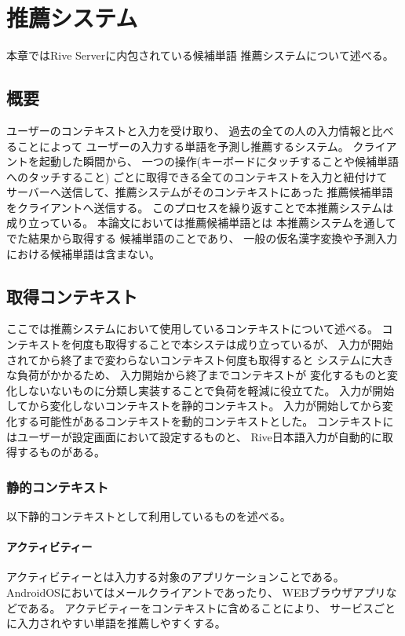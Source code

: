 \chapter{推薦システム}
\label{chap:recommend}
本章ではRive Serverに内包されている候補単語
推薦システムについて述べる。

\newpage
\section{概要}
ユーザーのコンテキストと入力を受け取り、
過去の全ての人の入力情報と比べることによって
ユーザーの入力する単語を予測し推薦するシステム。
クライアントを起動した瞬間から、
一つの操作(キーボードにタッチすることや候補単語へのタッチすること)
ごとに取得できる全てのコンテキストを入力と紐付けて
サーバーへ送信して、推薦システムがそのコンテキストにあった
推薦候補単語をクライアントへ送信する。
このプロセスを繰り返すことで本推薦システムは成り立っている。
本論文においては推薦候補単語とは
本推薦システムを通してでた結果から取得する
候補単語のことであり、
一般の仮名漢字変換や予測入力における候補単語は含まない。

\section{取得コンテキスト}
\label{sec:getcontext}
ここでは推薦システムにおいて使用しているコンテキストについて述べる。
コンテキストを何度も取得することで本システは成り立っているが、
入力が開始されてから終了まで変わらないコンテキスト何度も取得すると
システムに大きな負荷がかかるため、
入力開始から終了までコンテキストが
変化するものと変化しないないものに分類し実装することで負荷を軽減に役立てた。
入力が開始してから変化しないコンテキストを静的コンテキスト。
入力が開始してから変化する可能性があるコンテキストを動的コンテキストとした。
コンテキストにはユーザーが設定画面において設定するものと、
Rive日本語入力が自動的に取得するものがある。

\subsection{静的コンテキスト}
\label{staticcontext}
以下静的コンテキストとして利用しているものを述べる。

\subsubsection{アクティビティー}
\label{activity}
アクティビティーとは入力する対象のアプリケーションことである。
AndroidOSにおいてはメールクライアントであったり、
WEBブラウザアプリなどである。
アクテビティーをコンテキストに含めることにより、
サービスごとに入力されやすい単語を推薦しやすくする。

